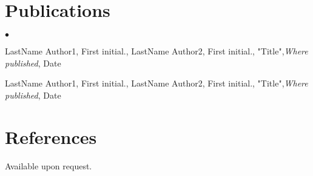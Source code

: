\documentclass[margin,line]{res}
\newenvironment{list2}{
  \begin{list}{$\bullet$}{%
      \setlength{\itemsep}{0in}
      \setlength{\parsep}{0in} \setlength{\parskip}{0in}
      \setlength{\topsep}{0in} \setlength{\partopsep}{0in}
      \setlength{\leftmargin}{0.2in}}}{\end{list}}
\begin{document}
\begin{resume}
\section{\sc Publications}

\begin{list2}
\item LastName Author1, First initial., LastName Author2, First initial.,  "Title",{\em Where published}, Date
\item LastName Author1, First initial., LastName Author2, First initial.,  "Title",{\em Where published}, Date
\end{list2}


\section{\sc References }

Available upon request.

\end{resume}
\end{document}
